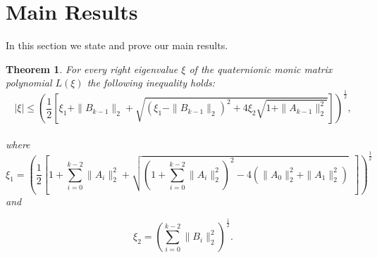 \documentclass [12pt]{article}
\newtheorem{theorem}{Theorem}
[section]
\begin{document}
\section{Main Results}
In this section we state and prove our main results.
\begin{theorem}{\label{theorem 3.5}}
    For every right eigenvalue $\xi$ of the quaternionic monic matrix polynomial $L(\xi)$ the following inequality holds:\\
    \begin{equation*}
|\xi| \le \left( \frac{1}{2} \left[  \xi_{1}+\|B_{k-1}\|_{2}  +\sqrt{(\xi_{1}-\|B_{k-1}\|_{2})^{2}+4\xi_{2} \sqrt{1+\|A_{k-1}\|^{2}_{2}}} \right] \right)^{\frac{1}{2}},
\end{equation*}\\
where \begin{equation*}
\xi_{1} = \left( \frac{1}{2} \left[ 1+\sum_{i=0}^{k-2}\|A_{i}\|_{2}^{2}  +  \sqrt{\left(1+\sum_{i=0}^{k-2}\|A_{i}\|_{2}^{2}\right)^{2}-4\left(\|A_{0}\|_{2}^{2}+\|A_{1}\|_{2}^{2}\right)} ~~\right] \right)^{\frac{1}{2}} 
\end{equation*}
and 

\begin{equation*}
    \xi_{2}=\left( \sum_{i=0}^{k-2} \|B_{i}\|_{2}^{2}\right)^{\frac{1}{2}}.
\end{equation*}
\end{theorem}
\end{document}
